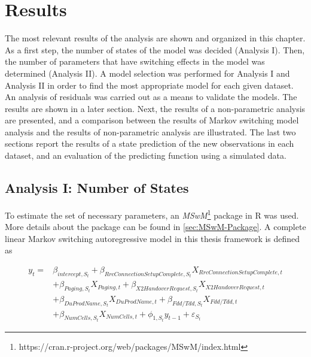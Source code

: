 
\lhead[\chaptername~\thechapter]{\rightmark}

\rhead[\leftmark]{}

\lfoot[\thepage]{}

\cfoot{}

\rfoot[]{\thepage}

\chapter{Results}

The most relevant results of the analysis are shown and organized
in this chapter. As a first step, the number of states of the model
was decided (Analysis I). Then, the number of parameters that have
switching effects in the model was determined (Analysis II). A model
selection was performed for Analysis I and Analysis II in order to
find the most appropriate model for each given dataset. An analysis
of residuals was carried out as a means to validate the models. The
results are shown in a later section. Next, the results of a non-parametric
analysis are presented, and a comparison between the results of Markov
switching model analysis and the results of non-parametric analysis
are illustrated. The last two sections report the results of a state
prediction of the new observations in each dataset, and an evaluation
of the predicting function using a simulated data. 

\section{Analysis I: Number of States \label{sec:States}}

To estimate the set of necessary parameters, an \emph{MSwM}\footnote{https://cran.r-project.org/web/packages/MSwM/index.html}
package in R was used. More details about the package can be found
in \ref{sec:MSwM-Package}. A complete linear Markov switching autoregressive
model in this thesis framework is defined as

\begin{align}
y_{t}= & \beta_{intercept,S_{t}}+\beta_{RrcConnectionSetupComplete,S_{t}}X_{RrcConnectionSetupComplete,t}\nonumber \\
 & +\beta_{Paging,S_{t}}X_{Paging,t}+\beta_{X2HandoverRequest,S_{t}}X_{X2HandoverRequest,t}\label{eq:mswm}\\
 & +\beta_{DuProdName,S_{t}}X_{DuProdName,t}+\beta_{Fdd/Tdd,S_{t}}X_{Fdd/Tdd,t}\nonumber \\
 & +\beta_{NumCells,S_{t}}X_{NumCells,t}+\phi_{1,S_{t}}y_{t-1}+\varepsilon_{S_{t}}\nonumber 
\end{align}

